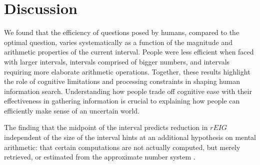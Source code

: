 \documentclass[10pt,letterpaper]{article}
\begin{document}
\section{Discussion}
We found that the efficiency of questions posed by humans, compared to the optimal question, varies systematically as a function of the magnitude and arithmetic properties of the current interval. People were less efficient when faced with larger intervals, intervals comprised of bigger numbers, and intervals requiring more elaborate arithmetic operations. 
Together, these results highlight the role of cognitive limitations and processing constraints in shaping human information search. Understanding how people trade off cognitive ease with their effectiveness in gathering information is crucial to explaining how people can efficiently make sense of an uncertain world. 


The finding that the midpoint of the interval predicts reduction in $rEIG$ independent of the size of the interval hints at an additional hypothesis on mental arithmetic: that certain computations are not actually computed, but merely retrieved, or estimated from the approximate number system \cite{dehaene2011number, zbrodoff19959+}. 
\end{document}

